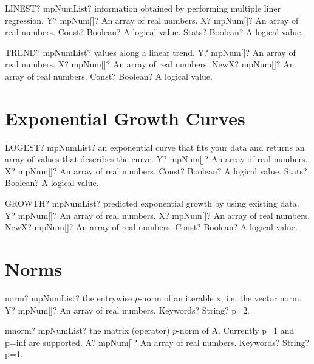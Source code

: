 \documentclass[12pt,a4paper,openany]{book}
\begin{document}
\begin{mpFunctionsExtract}
\mpWorksheetFunctionFourNotImplemented
{LINEST? mpNumList? information obtained by performing multiple liner regression.}
{Y? mpNum[]? An array of real numbers.}
{X? mpNum[]? An array of real numbers.}
{Const? Boolean? A logical value.}
{Stats? Boolean? A logical value.}
\end{mpFunctionsExtract}

\begin{mpFunctionsExtract}
\mpWorksheetFunctionFourNotImplemented
{TREND? mpNumList? values along a linear trend.}
{Y? mpNum[]? An array of real numbers.}
{X? mpNum[]? An array of real numbers.}
{NewX? mpNum[]? An array of real numbers.}
{Const? Boolean? A logical value.}
\end{mpFunctionsExtract}

\section{Exponential Growth Curves}

\begin{mpFunctionsExtract}
\mpWorksheetFunctionFourNotImplemented
{LOGEST? mpNumList? an exponential curve that fits your data and returns an array of values that describes the curve.}
{Y? mpNum[]? An array of real numbers.}
{X? mpNum[]? An array of real numbers.}
{Const? Boolean? A logical value.}
{Stats? Boolean? A logical value.}
\end{mpFunctionsExtract}

\begin{mpFunctionsExtract}
\mpWorksheetFunctionFourNotImplemented
{GROWTH? mpNumList? predicted exponential growth by using existing data.}
{Y? mpNum[]? An array of real numbers.}
{X? mpNum[]? An array of real numbers.}
{NewX? mpNum[]? An array of real numbers.}
{Const? Boolean? A logical value.}
\end{mpFunctionsExtract}

\section{Norms}

\begin{mpFunctionsExtract}
\mpFunctionTwo
{norm? mpNumList? the entrywise $p$-norm of an iterable x, i.e. the vector norm.}
{Y? mpNum[]? An array of real numbers.}
{Keywords? String?  p=2.}
\end{mpFunctionsExtract}

\begin{mpFunctionsExtract}
\mpFunctionTwo
{mnorm? mpNumList? the matrix (operator) $p$-norm of A. Currently p=1 and p=inf are supported.}
{A? mpNum[]? An array of real numbers.}
{Keywords? String?  p=1.}
\end{mpFunctionsExtract}
\end{document}
